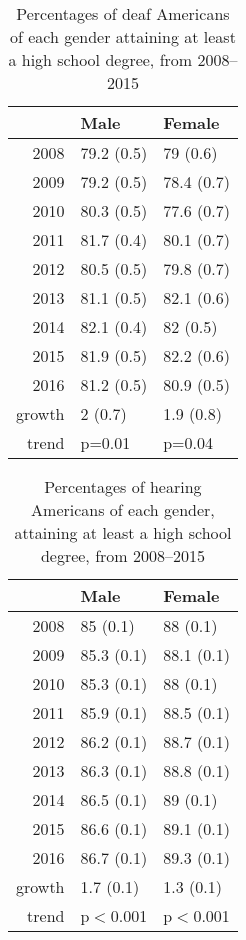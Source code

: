 \documentclass{article}\usepackage[]{graphicx}\usepackage[]{color}
\begin{document}
\begin{table}[ht]
\centering
\begin{tabular}{rll}
  \hline
 & Male & Female \\
  \hline
2008 & 79.2 (0.5) & 79 (0.6) \\
  2009 & 79.2 (0.5) & 78.4 (0.7) \\
  2010 & 80.3 (0.5) & 77.6 (0.7) \\
  2011 & 81.7 (0.4) & 80.1 (0.7) \\
  2012 & 80.5 (0.5) & 79.8 (0.7) \\
  2013 & 81.1 (0.5) & 82.1 (0.6) \\
  2014 & 82.1 (0.4) & 82 (0.5) \\
  2015 & 81.9 (0.5) & 82.2 (0.6) \\
  2016 & 81.2 (0.5) & 80.9 (0.5) \\
  growth & 2 (0.7)  & 1.9 (0.8)  \\
  trend & p=0.01 & p=0.04 \\
   \hline
\end{tabular}
\caption{Percentages of deaf Americans of each gender attaining at least a high school degree, from 2008--2015}
\end{table}
\begin{table}[ht]
\centering
\begin{tabular}{rll}
  \hline
 & Male & Female \\
  \hline
2008 & 85 (0.1) & 88 (0.1) \\
  2009 & 85.3 (0.1) & 88.1 (0.1) \\
  2010 & 85.3 (0.1) & 88 (0.1) \\
  2011 & 85.9 (0.1) & 88.5 (0.1) \\
  2012 & 86.2 (0.1) & 88.7 (0.1) \\
  2013 & 86.3 (0.1) & 88.8 (0.1) \\
  2014 & 86.5 (0.1) & 89 (0.1) \\
  2015 & 86.6 (0.1) & 89.1 (0.1) \\
  2016 & 86.7 (0.1) & 89.3 (0.1) \\
  growth & 1.7 (0.1)  & 1.3 (0.1)  \\
  trend & p$<$0.001 & p$<$0.001 \\
   \hline
\end{tabular}
\caption{Percentages of hearing Americans of each gender, attaining at least a high school degree, from 2008--2015}
\end{table}
\end{document}
